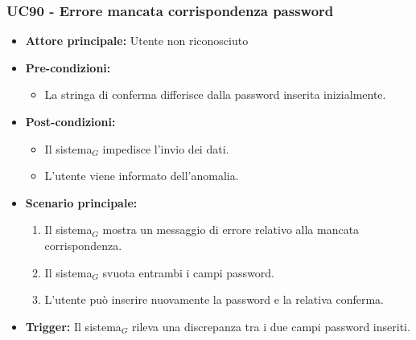 \documentclass[a4paper, 10pt]{article}
\begin{document}
\subsubsection{UC90 - Errore mancata corrispondenza password}
\hypertarget{uc:90}{}
\begin{itemize}
    \item \textbf{Attore principale:} Utente non riconosciuto
    \item \textbf{Pre-condizioni:} 
        \begin{itemize}
            \item La stringa di conferma differisce dalla password inserita inizialmente.
        \end{itemize}
    \item \textbf{Post-condizioni:} 
        \begin{itemize}
            \item Il sistema$_G$ impedisce l'invio dei dati.
            \item L'utente viene informato dell'anomalia.
        \end{itemize}
    \item \textbf{Scenario principale:}
        \begin{enumerate}
            \item Il sistema$_G$ mostra un messaggio di errore relativo alla mancata corrispondenza.
            \item Il sistema$_G$ svuota entrambi i campi password.
            \item L'utente può inserire nuovamente la password e la relativa conferma.
        \end{enumerate}
    \item \textbf{Trigger:} Il sistema$_G$ rileva una discrepanza tra i due campi password inseriti.
\end{itemize}
\end{document}
